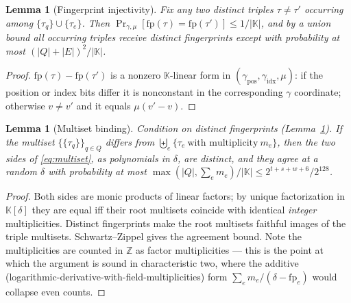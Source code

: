 \documentclass[11pt]{article}
\newtheorem{lemma}[theorem]{Lemma}
\theoremstyle{definition}
\newcommand{\K}{\mathbb{K}}
\newcommand{\Z}{\mathbb{Z}}
\newcommand{\fp}{\mathrm{fp}}
\begin{document}
\begin{lemma}[Fingerprint injectivity]\label{lem:collision}
Fix any two distinct triples $\tau\ne\tau'$ occurring among
$\{\tau_q\}\cup\{\tau_e\}$. Then
$\Pr_{\gamma,\mu}[\fp(\tau)=\fp(\tau')]\le 1/|\K|$, and by a union bound
all occurring triples receive distinct fingerprints except with
probability at most $(|Q|+|E|)^2/|\K|$.
\end{lemma}
\begin{proof}
$\fp(\tau)-\fp(\tau')$ is a nonzero $\K$-linear form in
$(\gamma_{\mathrm{pos}},\gamma_{\mathrm{idx}},\mu)$: if the position or
index bits differ it is nonconstant in the corresponding $\gamma$
coordinate; otherwise $v\ne v'$ and it equals $\mu(v'-v)$.
\end{proof}

\begin{lemma}[Multiset binding]\label{lem:multiset}
Condition on distinct fingerprints (Lemma~\ref{lem:collision}). If the
multiset $\{\!\{\tau_q\}\!\}_{q\in Q}$ differs from
$\biguplus_e \{\tau_e\ \text{with multiplicity}\ m_e\}$, then the two
sides of \eqref{eq:multiset}, as polynomials in $\delta$, are distinct,
and they agree at a random $\delta$ with probability at most
$\max(|Q|,\textstyle\sum_e m_e)/|\K| \le 2^{t+s+w+6}/2^{128}$.
\end{lemma}
\begin{proof}
Both sides are monic products of linear factors; by unique factorization
in $\K[\delta]$ they are equal iff their root multisets coincide with
identical \emph{integer} multiplicities. Distinct fingerprints make the
root multisets faithful images of the triple multisets. Schwartz--Zippel
gives the agreement bound. Note the multiplicities are counted in $\Z$
as factor multiplicities --- this is the point at which the argument is
sound in characteristic two, where the additive
(logarithmic-derivative-with-field-multiplicities) form
$\sum_e m_e/(\delta-\fp_e)$ would collapse even counts.
\end{proof}
\end{document}
